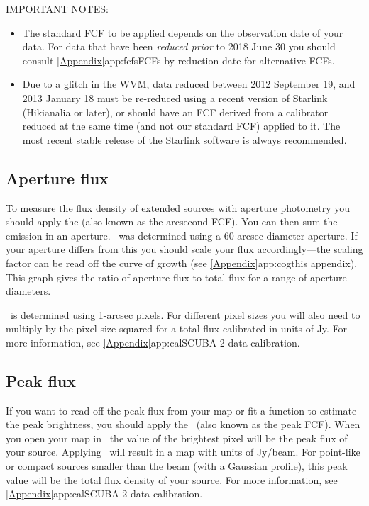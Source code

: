 \begin{sltextbox}{IMPORTANT NOTES:}
  \begin{itemize}
  \item The standard FCF to be applied depends on the observation date
    of your data. For data that have been \emph{reduced prior} to
    2018 June 30 you should consult \cref{Appendix}{app:fcfs}{FCFs by
      reduction date} for alternative FCFs.

  \item Due to a glitch in the WVM, data reduced between 2012
    September 19, and 2013 January 18 must be re-reduced using a
    recent version of Starlink (Hikianalia or later), or should have
    an FCF derived from a calibrator reduced at the same time (and not
    our standard FCF) applied to it. The most recent stable release of
    the Starlink software is always recommended.
  \end{itemize}
\end{sltextbox}


\subsection{Aperture flux}

To measure the flux density of extended sources with aperture photometry
you should apply the \fcfa (also known as the arcsecond FCF).
You can then sum the emission in an
aperture. \fcfa\ was determined using a 60-arcsec diameter
aperture. If your aperture differs from this you should scale your
flux accordingly---the scaling factor can be read off the curve of
growth (see \cref{Appendix}{app:cog}{this appendix}). This graph gives
the ratio of aperture flux to total flux for a range of aperture
diameters.

\fcfa\ is determined using 1-arcsec pixels. For different pixel sizes
you will also need to multiply by the pixel size squared for a total
flux calibrated in units of Jy. For more information, see
\cref{Appendix}{app:cal}{SCUBA-2 data calibration}.

\subsection{Peak flux}

If you want to read off the peak flux from your map or fit
a function to estimate the peak brightness, you should apply
the \fcfb\ (also known as the peak FCF).  When you open your map in
\gaia\ the value of the brightest pixel will be the peak flux of your
source. Applying \fcfb\ will result in a map with
units of Jy/beam. For point-like or compact sources smaller than the
beam (with a Gaussian profile), this peak value will be the total flux
density of your source. For more information, see
\cref{Appendix}{app:cal}{SCUBA-2 data calibration}.

